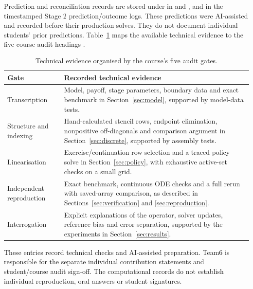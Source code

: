 \documentclass[11pt,a4paper]{article}
\numberwithin{equation}{section}
\begin{document}
Prediction and reconciliation records are stored under 
in  and ,
and in the timestamped Stage 2 prediction/outcome logs. These predictions were AI-assisted and recorded
before their production solves. They do not document individual students'
prior predictions. Table~\ref{tab:audit} maps the available technical
evidence to the five course audit headings \cite{projectBrief}.

\begin{table}[htbp]
\centering\small
\caption{Technical evidence organised by the course's five audit gates.}
\label{tab:audit}
\begin{tabular}{@{}>{\raggedright\arraybackslash}p{.25\linewidth}>{\raggedright\arraybackslash}p{.70\linewidth}@{}}
\toprule
Gate & Recorded technical evidence\\
\midrule
Transcription & Model, payoff, stage parameters, boundary data and exact
benchmark in Section~\ref{sec:model}, supported by model-data tests.\\[3pt]
Structure and indexing & Hand-calculated stencil rows, endpoint elimination,
nonpositive off-diagonals and comparison argument in
Section~\ref{sec:discrete}, supported by assembly tests.\\[3pt]
Linearisation & Exercise/continuation row selection and a traced policy solve
in Section~\ref{sec:policy}, with exhaustive active-set checks on a small grid.\\[3pt]
Independent reproduction & Exact benchmark, continuous ODE checks and a full
rerun with saved-array comparison, as described in
Sections~\ref{sec:verification} and \ref{sec:reproduction}.\\[3pt]
Interrogation & Explicit explanations of the operator, solver updates,
reference bias and error separation, supported by the experiments in
Section~\ref{sec:results}.\\
\bottomrule
\end{tabular}
\end{table}
These entries record technical checks and AI-assisted preparation.
Team6 is responsible for the separate individual contribution statements
and student/course audit sign-off. The computational records do not
establish individual reproduction, oral answers or student signatures.
\end{document}
